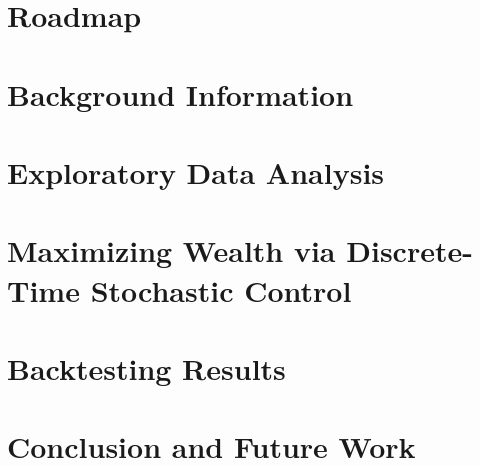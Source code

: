 \documentclass{beamer}
\begin{document}
	
    \maketitle
    \addtocounter{framenumber}{-3}
    \section*{Roadmap}
    
    {
	\makeatletter {} \makeatother
    }

    \section{Background Information}
    
    
    \section{Exploratory Data Analysis}
    
    
    
    \section{Maximizing Wealth via Discrete-Time Stochastic Control}
    

    \section{Backtesting Results}
    
    
    \section{Conclusion and Future Work}
    
    
    \section*{}
    
    
\end{document}
